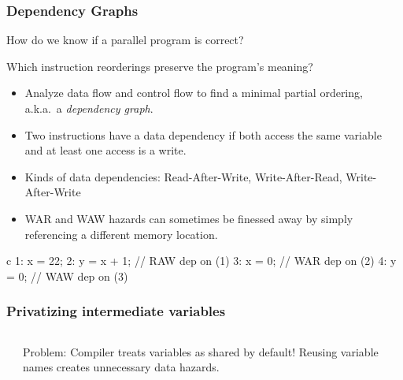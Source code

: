 \documentclass[]{beamer}
\begin{document}
\begin{frame}[fragile]
  \frametitle{Dependency Graphs}

  How do we know if a parallel program is correct? 

  Which instruction reorderings preserve the program's meaning?

  \begin{itemize}

  \item Analyze data flow and control flow to find a minimal partial ordering, a.k.a.\ a \emph{dependency graph}.

  \item Two instructions have a data dependency if both access the same variable and at least one access is a write.

  \item Kinds of data dependencies: Read-After-Write, Write-After-Read, Write-After-Write

  \item WAR and WAW hazards can sometimes be finessed away by simply referencing a different memory location.

  \end{itemize}

      \begin{ccode}[]
        {c}
        1: x = 22;
        2: y = x + 1;     // RAW dep on (1)
        3: x = 0;         // WAR dep on (2)
        4: y = 0;         // WAW dep on (3)
      \end{ccode}
\end{frame}


\begin{frame}[fragile]
  \frametitle{Privatizing intermediate variables}
  \begin{columns}[t]%
    \begin{column}{0.6\textwidth}
    \end{column}

    \begin{column}{0.4\textwidth}
      Problem: Compiler treats variables as shared by default! Reusing variable names creates unnecessary data hazards.
    \end{column}
  \end{columns}
\end{frame}
\end{document}
